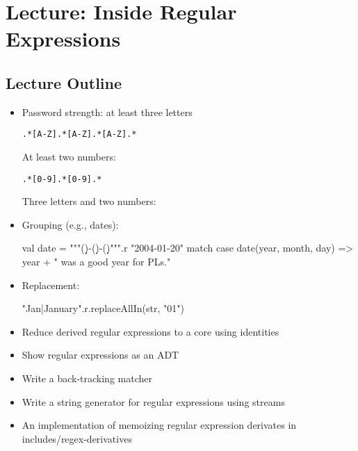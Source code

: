 \chapter{Lecture: Inside Regular Expressions}
\startlecture

\begin{instructor}

\section*{Lecture Outline}

\begin{itemize}

\item Password strength: at least three letters

\begin{verbatim}
.*[A-Z].*[A-Z].*[A-Z].*
\end{verbatim}

At least two numbers:

\begin{verbatim}
.*[0-9].*[0-9].*
\end{verbatim}

Three letters and two numbers:

\item Grouping (e.g., dates):

\begin{scalacode}
    val date = """(\d\d\d\d)-(\d\d)-(\d\d)""".r
    "2004-01-20" match {
      case date(year, month, day) => year + " was a good year for PLs."
    }
\end{scalacode}

\item Replacement:

\begin{scalacode}
"Jan|January".r.replaceAllIn(str, "01")
\end{scalacode}

\item Reduce derived regular expressions to a core using identities

\item Show regular expressions as an ADT

\item Write a back-tracking matcher

\item Write a string generator for regular expressions using streams

\item An implementation of memoizing regular expression derivates in includes/regex-derivatives

\end{itemize}

\end{instructor}